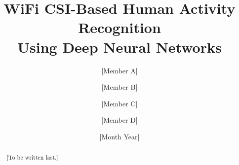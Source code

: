 \documentclass[12pt,a4paper,oneside]{report}
\title{WiFi CSI-Based Human Activity Recognition\\Using Deep Neural Networks}
\author{[Member A] \and [Member B] \and [Member C] \and [Member D]}
\date{[Month Year]}
\begin{document}
\maketitle


\begin{abstract}
[To be written last.]
\end{abstract}

\tableofcontents
\listoffigures
\listoftables










\end{document}
